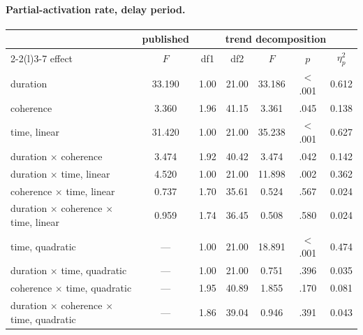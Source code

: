 \paragraph{Partial-activation rate, delay period.}
\begin{center}\small
\begin{tabular}{lcccccc}
\toprule
 & \multicolumn{1}{c}{published} & \multicolumn{5}{c}{trend decomposition}\\
\cmidrule(lr){2-2}\cmidrule(l){3-7}
effect & $F$ & df1 & df2 & $F$ & $p$ & $\eta_p^2$\\
\midrule
duration & 33.190 & 1.00 & 21.00 & 33.186 & $<$.001 & 0.612\\
coherence & 3.360 & 1.96 & 41.15 & 3.361 & .045 & 0.138\\
time, linear & 31.420 & 1.00 & 21.00 & 35.238 & $<$.001 & 0.627\\
duration $\times$ coherence & 3.474 & 1.92 & 40.42 & 3.474 & .042 & 0.142\\
duration $\times$ time, linear & 4.520 & 1.00 & 21.00 & 11.898 & .002 & 0.362\\
coherence $\times$ time, linear & 0.737 & 1.70 & 35.61 & 0.524 & .567 & 0.024\\
duration $\times$ coherence $\times$ time, linear & 0.959 & 1.74 & 36.45 & 0.508 & .580 & 0.024\\
time, quadratic & --- & 1.00 & 21.00 & 18.891 & $<$.001 & 0.474\\
duration $\times$ time, quadratic & --- & 1.00 & 21.00 & 0.751 & .396 & 0.035\\
coherence $\times$ time, quadratic & --- & 1.95 & 40.89 & 1.855 & .170 & 0.081\\
duration $\times$ coherence $\times$ time, quadratic & --- & 1.86 & 39.04 & 0.946 & .391 & 0.043\\
\bottomrule
\end{tabular}
\end{center}

